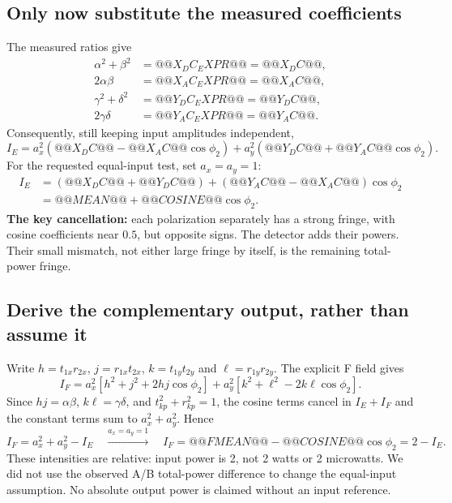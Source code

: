 \documentclass[11pt,a4paper]{article}
\begin{document}
\subsection{Only now substitute the measured coefficients}
The measured ratios give
\begin{align}
\alpha^2+\beta^2&=@@X_DC_EXPR@@=@@X_DC@@,\\
2\alpha\beta&=@@X_AC_EXPR@@=@@X_AC@@,\\
\gamma^2+\delta^2&=@@Y_DC_EXPR@@=@@Y_DC@@,\\
2\gamma\delta&=@@Y_AC_EXPR@@=@@Y_AC@@.
\end{align}
Consequently, still keeping input amplitudes independent,
\begin{equation}
I_E=a_x^2(@@X_DC@@-@@X_AC@@\cos\phi_2)
+a_y^2(@@Y_DC@@+@@Y_AC@@\cos\phi_2).
\end{equation}
For the requested equal-input test, set $a_x=a_y=1$:
\begin{align}
I_E&=(@@X_DC@@+@@Y_DC@@)
+(@@Y_AC@@-@@X_AC@@)\cos\phi_2\\
&=\boxed{@@MEAN@@+@@COSINE@@\cos\phi_2}.
\end{align}
\textbf{The key cancellation:} each polarization separately has a strong
fringe, with cosine coefficients near $0.5$, but opposite signs. The detector
adds their powers. Their small mismatch, not either large fringe by itself,
is the remaining total-power fringe.

\subsection{Derive the complementary output, rather than assume it}
Write $h=t_{1x}r_{2x}$, $j=r_{1x}t_{2x}$,
$k=t_{1y}t_{2y}$ and $\ell=r_{1y}r_{2y}$. The explicit F field gives
\begin{equation}
I_F=a_x^2[h^2+j^2+2hj\cos\phi_2]
+a_y^2[k^2+\ell^2-2k\ell\cos\phi_2].
\end{equation}
Since $hj=\alpha\beta$, $k\ell=\gamma\delta$, and
$t_{kp}^2+r_{kp}^2=1$, the cosine terms cancel in $I_E+I_F$ and the constant
terms sum to $a_x^2+a_y^2$. Hence
\[
I_F=a_x^2+a_y^2-I_E
\quad\xrightarrow{a_x=a_y=1}\quad
\boxed{I_F=@@FMEAN@@-@@COSINE@@\cos\phi_2=2-I_E.}
\]
These intensities are relative: input power is 2, not 2 watts or 2 microwatts.
We did not use the observed A/B total-power difference to change the equal-input
assumption. No absolute output power is claimed without an input reference.
\end{document}
